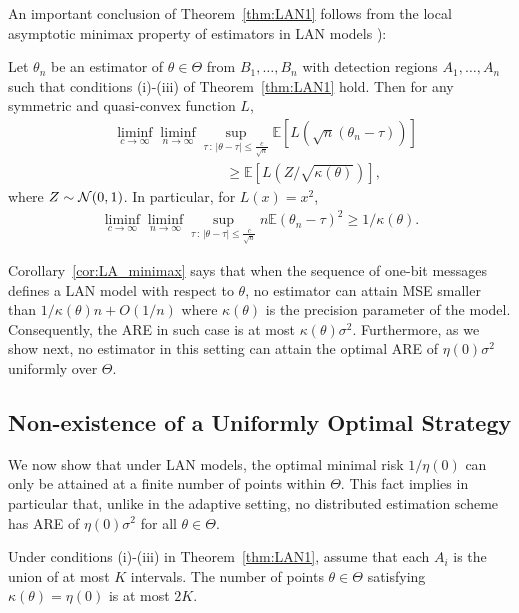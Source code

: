 %
An important conclusion of Theorem~\ref{thm:LAN1} follows from the local asymptotic minimax property of estimators in LAN models \cite{van2000asymptotic}):
\begin{cor} \label{cor:LA_minimax}
Let ${\theta}_n$ be an estimator of $\theta \in \Theta$ from $B_1,\ldots,B_n$ with detection regions $A_1,\ldots,A_n$ such that conditions (i)-(iii) of Theorem~\ref{thm:LAN1} hold. Then for any symmetric and quasi-convex function $L$, 
\begin{align*}
& \liminf_{c \to \infty} \liminf_{n \to \infty} \sup_{\tau\,:\,|\theta-\tau| \leq \frac{c}{\sqrt{n} }}  \mathbb E \left[ L\left( \sqrt{n}({\theta}_{n} - \tau) \right) \right]
\\
& \qquad \qquad \qquad \qquad \geq \mathbb E \left[ L (Z/\sqrt{\kappa(\theta)}) \right],
\end{align*}
where $Z \sim \mathcal{N}(0,1)$. In particular, for $L(x) = x^2$,
\begin{align*}
\liminf_{c \to \infty} \liminf_{n \to \infty} \sup_{\tau\,:\,|\theta-\tau| \leq \frac{c}{\sqrt{n} }}  n \mathbb E  \left( {\theta}_{n} - \tau \right)^2 \geq 1/\kappa(\theta).
\end{align*}
\end{cor}
%
Corollary~\ref{cor:LA_minimax} says that when the sequence of one-bit messages defines a LAN model with respect to $\theta$, no estimator can attain MSE smaller than $1/\kappa(\theta)n + O(1/n)$ where $\kappa(\theta)$ is the precision parameter of the model. Consequently, the ARE  in such case is at most $\kappa(\theta)\sigma^2$. Furthermore, as we show next, no estimator in this setting can attain the optimal ARE of $\eta(0)\sigma^2$ uniformly over $ \Theta$.

\subsection{Non-existence of a Uniformly Optimal Strategy}
We now show that under LAN models, the optimal minimal risk $1/\eta(0)$ can only be attained at a finite number of points within $\Theta$. This fact implies in particular that, unlike in the adaptive setting, no distributed estimation scheme has ARE of $\eta(0)\sigma^2$ for all $\theta \in \Theta$. 

\begin{thm} \label{thm:non_existence}
Under conditions (i)-(iii) in Theorem~\ref{thm:LAN1}, assume that each $A_i$ is the union of at most $K$ intervals. The number of points $\theta \in \Theta$ satisfying $\kappa(\theta) = \eta(0)$ is at most $2K$. 
\end{thm}

